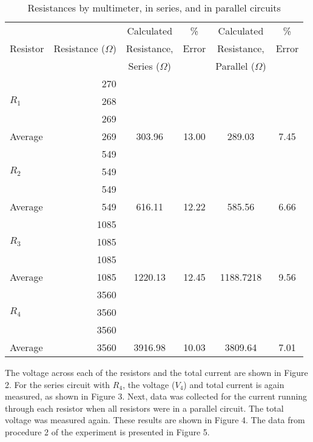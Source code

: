 \documentclass [12pt, letterpaper, twoside] {article}
\begin{document}
\begin{table}
  \centering
  \begin{tabular}{| l | r | c | c | c | c |}
    \hline\hline
    \multirow {3}{*}{Resistor} & & Calculated & \% & Calculated & \% \\
    & Resistance (\(\Omega\)) & Resistance, & Error & Resistance, & Error \\
    & & Series (\(\Omega\)) & & Parallel (\(\Omega\)) & \\
    \hline
    \multirow {3}{*}{\(R_{1}\)} & 270 & & & & \\
    & 268 & & & & \\
    & 269 & & & & \\
    \hline
    Average & 269 & 303.96 & 13.00 & 289.03 & 7.45 \\ %
    \hline
    \multirow {3}{*}{\(R_{2}\)} & 549 & & & & \\
    & 549 & & & & \\
    & 549 & & & & \\
    \hline
    Average & 549 & 616.11 & 12.22 & 585.56 & 6.66 \\ %
    \hline
    \multirow {3}{*}{\(R_{3}\)} & 1085 & & & & \\
    & 1085 & & & & \\
    & 1085 & & & & \\
    \hline
    Average & 1085 & 1220.13 & 12.45 & 1188.7218 & 9.56 \\ %
    \hline
    \multirow {3}{*}{\(R_{4}\)} & 3560 & & & & \\
    & 3560 & & & & \\
    & 3560 & & & & \\
    \hline
    Average & 3560 & 3916.98 & 10.03 & 3809.64 & 7.01 \\ %
    \hline\hline
  \end{tabular}
  \caption{Resistances by multimeter, in series, and in parallel circuits}
\end{table}

\noindent
The voltage across each of the resistors and the total current are shown in Figure 2. For the series circuit with \(R_{4}\), the voltage (\(V_{4}\)) and total current is again measured, as shown in Figure 3. Next, data was collected for the current running through each resistor when all resistors were in a parallel circuit. The total voltage was measured again. These results are shown in Figure 4.
The data from procedure 2 of the experiment is presented in Figure 5.
\end{document}
